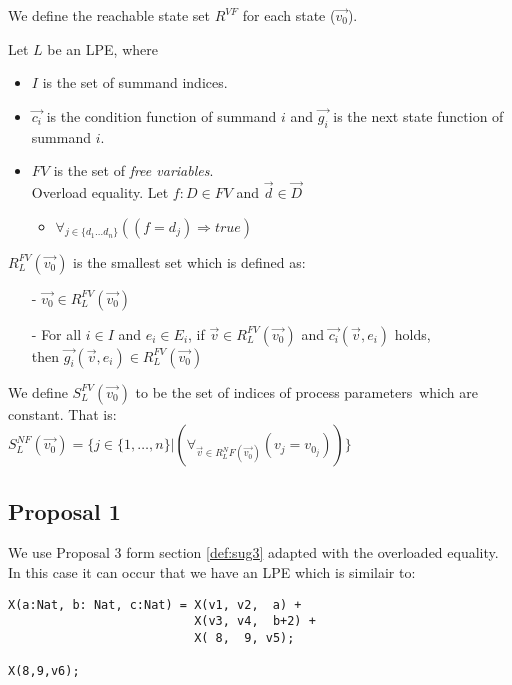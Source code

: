 \documentclass[a4paper,10pt]{article}
\theoremstyle{plain}
\theoremstyle{definition}
\newcommand{\ovr}{\overrightarrow}
\newcommand{\pps}{process parameters}
\newcommand{\ti}{\textit}
\begin{document}
We define the reachable state set $R^{VF}$ for each state ($\ovr{v_0}$). 
\begin{defn}\label{def:lpe} Let $L$ be an LPE, where\begin{itemize}
\item $I$ is the set of summand indices.
\item $\ovr{c_i}$ is the condition function of summand $i$ and $\ovr{g_i}$ is the next state function of summand $i$.
\item $FV$ is the set of \ti{free variables}.\\
   Overload equality. 
   Let $f:D \in FV$ and $\ovr{d} \in \ovr{D} $  
   \begin{itemize}
	\item $\forall_{j \in \lbrace d_1 \ldots d_n \rbrace }((f = d_j) \Rightarrow true) $ 
   \end{itemize}
\end{itemize}

$R_L^{FV}(\ovr{v_0})$ is the smallest set which is defined as:
  \begin{itemize}
    \item[-] $\ovr{v_0} \in R_L^{FV}(\ovr{v_0})$
    \item[-] For all $i \in I$ and $e_i \in E_i$, if $\ovr{v} \in R_L^{FV}(\ovr{v_0})$ and $\ovr{c_i}(\ovr{v}, e_i)$ holds, \\ then $\ovr{g_i}(\ovr{v}, e_i) \in R_L^{FV}(\ovr{v_0})$ \\
   \end{itemize}
\end{defn}

\begin{defn}\label{def:lpe_comp} We define $S_L^{FV}(\ovr{v_0})$ to be the set of indices of \pps\ which are constant. That is:\\

$S_L^{NF}(\ovr{v_0}) = \lbrace j \in  \lbrace 1, \ldots, n \rbrace \vert (\forall_{\ovr{v} \in R_L^NF
(\ovr{v_0})}( v_j = v_{0_j})) 
\rbrace $
\end{defn}

\subsection{Proposal 1}
We use Proposal 3 form section \ref{def:sug3} adapted with the overloaded equality.
In this case it can occur that we have an LPE which is similair to:
\begin{example} \label{def:exm_vf1}
\begin{verbatim}
X(a:Nat, b: Nat, c:Nat) = X(v1, v2,  a) +
                          X(v3, v4,  b+2) +
                          X( 8,  9, v5);

X(8,9,v6);
\end{verbatim}
\end{example}
\end{document}
